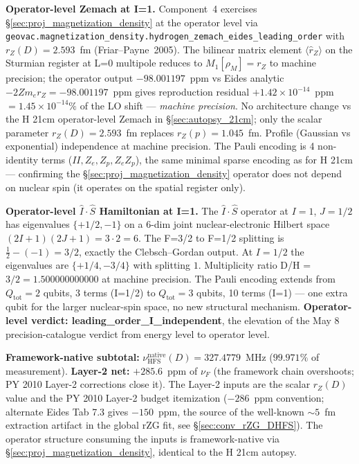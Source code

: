 \documentclass[11pt]{article}
\begin{document}
\textbf{Operator-level Zemach at I=1.}  Component~4 exercises
\S\ref{sec:proj_magnetization_density} at the operator level via
\texttt{geovac.magnetization\_density.hydrogen\_zemach\_eides\_leading\_order}
with $r_Z(D) = 2.593$~fm (Friar--Payne~2005).  The bilinear matrix
element $\langle\hat{r}_Z\rangle$ on the Sturmian register at L=0
multipole reduces to $M_1[\rho_M] = r_Z$ to machine precision; the
operator output $-98.001197$~ppm vs Eides analytic $-2 Z m_e r_Z =
-98.001197$~ppm gives reproduction residual
$+1.42 \times 10^{-14}$~ppm $= 1.45 \times 10^{-14}\%$ of the LO shift
--- \emph{machine precision}.  No architecture change vs the H 21cm
operator-level Zemach in \S\ref{sec:autopsy_21cm}; only the scalar
parameter $r_Z(D) = 2.593$~fm replaces $r_Z(p) = 1.045$~fm.  Profile
(Gaussian vs exponential) independence at machine precision.  The
Pauli encoding is 4 non-identity terms ($II, Z_e, Z_p, Z_e Z_p$),
the same minimal sparse encoding as for H 21cm --- confirming the
\S\ref{sec:proj_magnetization_density} operator does not depend on
nuclear spin (it operates on the spatial register only).

\textbf{Operator-level $\hat{I}\cdot\hat{S}$ Hamiltonian at I=1.}
The $\hat{I}\cdot\hat{S}$ operator at $I=1$, $J=1/2$ has eigenvalues
$\{+1/2, -1\}$ on a 6-dim joint nuclear-electronic Hilbert space
$(2I+1)(2J+1) = 3 \cdot 2 = 6$.  The F=3/2 to F=1/2 splitting is
$\frac{1}{2} - (-1) = 3/2$, exactly the Clebsch--Gordan output.  At
$I=1/2$ the eigenvalues are $\{+1/4, -3/4\}$ with splitting $1$.
Multiplicity ratio D/H = $3/2 = 1.500000000000$ at machine precision.
The Pauli encoding extends from $Q_\text{tot}=2$ qubits, 3 terms
(I=1/2) to $Q_\text{tot}=3$ qubits, 10 terms (I=1) --- one extra
qubit for the larger nuclear-spin space, no new structural mechanism.
\textbf{Operator-level verdict: leading\_order\_I\_independent}, the
elevation of the May 8 precision-catalogue verdict from energy level
to operator level.

\textbf{Framework-native subtotal:} $\nu_\text{HFS}^\text{native}(D) =
327.4779$~MHz ($99.971\%$ of measurement).  \textbf{Layer-2 net:}
$+285.6$~ppm of $\nu_F$ (the framework chain overshoots; PY 2010
Layer-2 corrections close it).  The Layer-2 inputs are the scalar
$r_Z(D)$ value and the PY 2010 Layer-2 budget itemization
($-286$~ppm convention; alternate Eides Tab 7.3 gives $-150$~ppm,
the source of the well-known $\sim 5$~fm extraction artifact in the
global rZG fit, see \S\ref{sec:conv_rZG_DHFS}).  The operator
structure consuming the inputs is framework-native via
\S\ref{sec:proj_magnetization_density}, identical to the H 21cm
autopsy.
\end{document}

